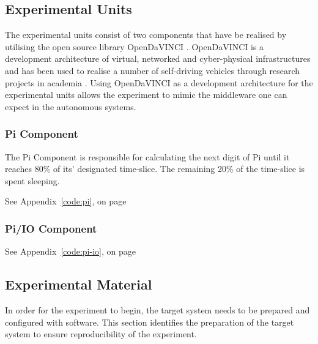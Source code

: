 \subsection{Experimental Units}
\label{section:exp-units}

The experimental units consist of two components that have be realised by utilising the open source library OpenDaVINCI \cite{OpenDaVINCI}. OpenDaVINCI is a development architecture of virtual, networked and cyber-physical infrastructures and has been used to realise a number of self-driving vehicles through research projects in academia \cite{OpenDaVINCI}. Using OpenDaVINCI as a development architecture for the experimental units allows the experiment to mimic the middleware one can expect in the autonomous systems. 

\subsubsection{Pi Component}

The Pi Component is responsible for calculating the next digit of Pi until it reaches 80\% of its' designated time-slice. The remaining 20\% of the time-slice is spent sleeping. 



See Appendix~\ref{code:pi}, on page ~\pageref{code:pi}

\subsubsection{Pi/IO Component}
See Appendix~\ref{code:pi-io}, on page ~\pageref{code:pi-io}


\subsection{Experimental Material}
In order for the experiment to begin, the target system needs to be prepared and configured with software. This section identifies the preparation of the target system to ensure reproducibility of the experiment.
 

